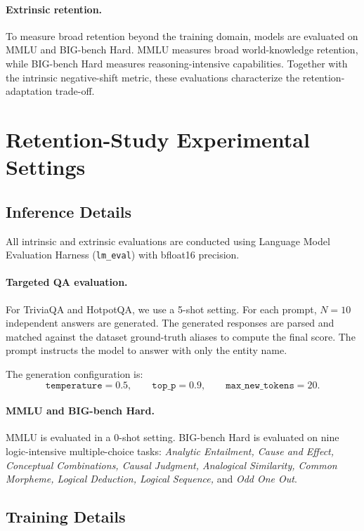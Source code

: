 \paragraph{Extrinsic retention.}
To measure broad retention beyond the training domain, models are evaluated on
MMLU and BIG-bench Hard. MMLU measures broad world-knowledge retention, while
BIG-bench Hard measures reasoning-intensive capabilities. Together with the
intrinsic negative-shift metric, these evaluations characterize the
retention-adaptation trade-off.


\section{Retention-Study Experimental Settings}
\label{app:retention_study_settings}

\subsection{Inference Details}
\label{app:retention_inference_details}

All intrinsic and extrinsic evaluations are conducted using Language Model
Evaluation Harness (\texttt{lm\_eval}) with bfloat16 precision.

\paragraph{Targeted QA evaluation.}
For TriviaQA and HotpotQA, we use a 5-shot setting. For each prompt, \(N=10\)
independent answers are generated. The generated responses are parsed and
matched against the dataset ground-truth aliases to compute the final score.
The prompt instructs the model to answer with only the entity name.

The generation configuration is:
\[
\texttt{temperature}=0.5,
\qquad
\texttt{top\_p}=0.9,
\qquad
\texttt{max\_new\_tokens}=20.
\]

\paragraph{MMLU and BIG-bench Hard.}
MMLU is evaluated in a 0-shot setting. BIG-bench Hard is evaluated on nine
logic-intensive multiple-choice tasks:
\textit{Analytic Entailment, Cause and Effect, Conceptual Combinations,
Causal Judgment, Analogical Similarity, Common Morpheme, Logical Deduction,
Logical Sequence,} and \textit{Odd One Out}.

\subsection{Training Details}
\label{app:retention_training_details}

